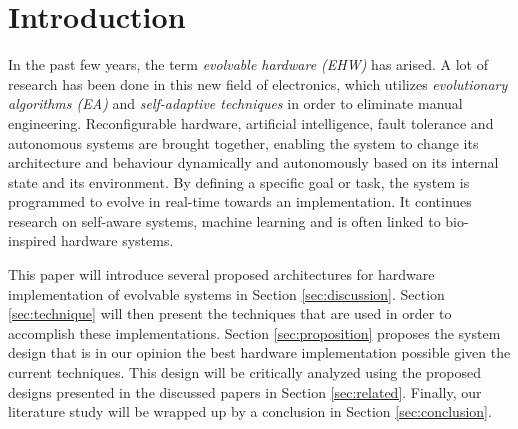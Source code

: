 \section{Introduction}
%
In the past few years, the term \emph{evolvable hardware (EHW)} has arised. A lot of research has been done in this new field of electronics, which utilizes \emph{evolutionary algorithms (EA)} and \emph{self-adaptive techniques}  in order to eliminate manual engineering. Reconfigurable hardware, artificial intelligence, fault tolerance and autonomous systems are brought together, enabling the system to change its architecture and behaviour dynamically and autonomously based on its internal state and its environment. By defining a specific goal or task, the system is programmed to evolve in real-time towards an implementation. It continues research on self-aware systems, machine learning and is often linked to bio-inspired hardware systems. 

This paper will introduce several proposed architectures for hardware implementation of evolvable systems in Section \ref{sec:discussion}. Section \ref{sec:technique} will then present the techniques that are used in order to accomplish these implementations. Section \ref{sec:proposition} proposes the system design that is in our opinion the best hardware implementation possible given the current techniques. This design will be critically analyzed using the proposed designs presented in the discussed papers in Section \ref{sec:related}. Finally, our literature study will be wrapped up by a conclusion in Section \ref{sec:conclusion}.